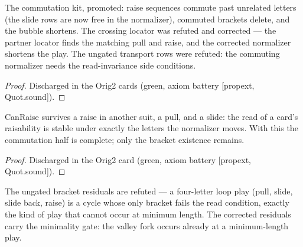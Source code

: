 \begin{theorem}\label{thm:normalizer}
\leanok
{}
The commutation kit, promoted: raise sequences commute past
unrelated letters (the slide rows are now free in the
normalizer), commuted brackets delete, and the bubble shortens.
The crossing locator was refuted and corrected --- the partner
locator finds the matching pull and raise, and the corrected
normalizer shortens the play.  The ungated transport rows were
refuted: the commuting normalizer needs the read-invariance
side conditions.
\end{theorem}

\begin{proof}
\leanok
Discharged in the Orig2 cards (green, axiom battery [propext, Quot.sound]).
\end{proof}

\begin{theorem}\label{thm:readInvariance}
\leanok
{}
CanRaise survives a raise in another suit, a pull, and a
slide: the read of a card's raisability is stable under exactly
the letters the normalizer moves.  With this the commutation
half is complete; only the bracket existence remains.
\end{theorem}

\begin{proof}
\leanok
Discharged in the Orig2 card (green, axiom battery [propext, Quot.sound]).
\end{proof}

\begin{theorem}\label{thm:minimalityGate}
\leanok
{}
The ungated bracket residuals are refuted --- a four-letter
loop play (pull, slide, slide back, raise) is a cycle whose
only bracket fails the read condition, exactly the kind of play
that cannot occur at minimum length.  The corrected residuals
carry the minimality gate: the valley fork occurs already at a
minimum-length play.
\end{theorem}

